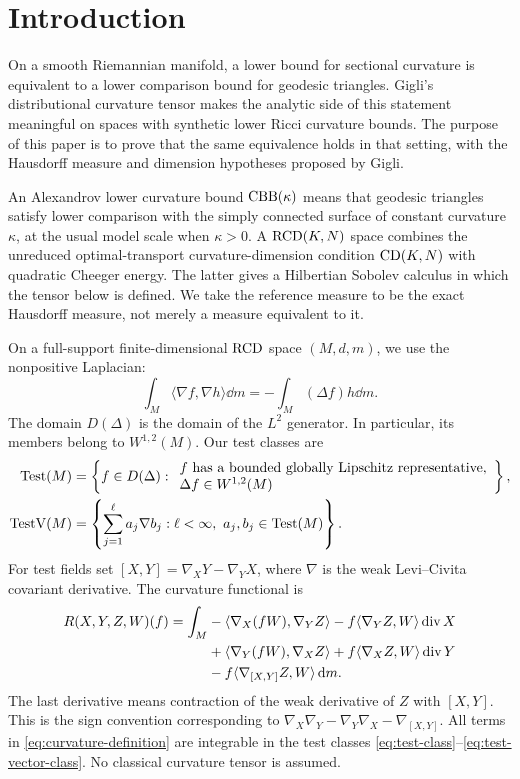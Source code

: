\section{Introduction}
\label{sec:introduction}

On a smooth Riemannian manifold, a lower bound for sectional curvature
is equivalent to a lower comparison bound for geodesic triangles.
Gigli's distributional curvature tensor makes the analytic side of
this statement meaningful on spaces with synthetic lower Ricci
curvature bounds. The purpose of this paper is to prove that the same
equivalence holds in that setting, with the Hausdorff measure and
dimension hypotheses proposed by Gigli.



An Alexandrov lower curvature bound \(\mathrm{CBB}(\kappa)\) means that
geodesic triangles satisfy lower comparison with the simply connected
surface of constant curvature \(\kappa\), at the usual model scale
when \(\kappa>0\). A \(\mathrm{RCD}(K,N)\) space combines the
unreduced optimal-transport curvature-dimension condition
\(\mathrm{CD}(K,N)\) with quadratic Cheeger energy. The latter gives a
Hilbertian Sobolev calculus in which the tensor below is defined.
We take the reference measure to be the exact Hausdorff measure,
not merely a measure equivalent to it.

On a full-support finite-dimensional \(\mathrm{RCD}\) space \((M,d,m)\),
we use the nonpositive Laplacian:
\[
\int_M\langle\nabla f,\nabla h\rangle\dd m
=-\int_M(\Delta f)h\dd m.
\]
The domain \(D(\Delta)\) is the domain of the \(L^2\) generator.
In particular, its members belong to \(W^{1,2}(M)\). Our test classes are
\begin{align}
\label{eq:test-class}
\operatorname{Test}(M)
&=\left\{f\in D(\Delta):
\begin{array}{l}f\text{ has a bounded globally Lipschitz representative},\\
\Delta f\in W^{1,2}(M)
\end{array}\right\},\\
\label{eq:test-vector-class}
\operatorname{TestV}(M)
&=\left\{\sum_{j=1}^{\ell}a_j\nabla b_j:
\ell<\infty,\ a_j,b_j\in\operatorname{Test}(M)\right\}.
\end{align}
For test fields set
\([X,Y]=\nabla_XY-\nabla_YX\), where \(\nabla\) is the weak
Levi--Civita covariant derivative. The curvature functional is
\begin{align}
\label{eq:curvature-definition}
R(X,Y,Z,W)(f)=\int_M&
-\langle\nabla_X(fW),\nabla_YZ\rangle
-f\langle\nabla_YZ,W\rangle\operatorname{div} X \notag\\
&+\langle\nabla_Y(fW),\nabla_XZ\rangle
+f\langle\nabla_XZ,W\rangle\operatorname{div} Y \notag\\
&-f\langle\nabla_{[X,Y]}Z,W\rangle\,\mathrm d m.
\end{align}
The last derivative means contraction of the weak derivative of \(Z\)
with \([X,Y]\). This is the sign convention corresponding to
\(\nabla_X\nabla_Y-\nabla_Y\nabla_X-\nabla_{[X,Y]}\).
All terms in \eqref{eq:curvature-definition} are integrable in the
test classes \eqref{eq:test-class}--\eqref{eq:test-vector-class}.
No classical curvature tensor is assumed.

